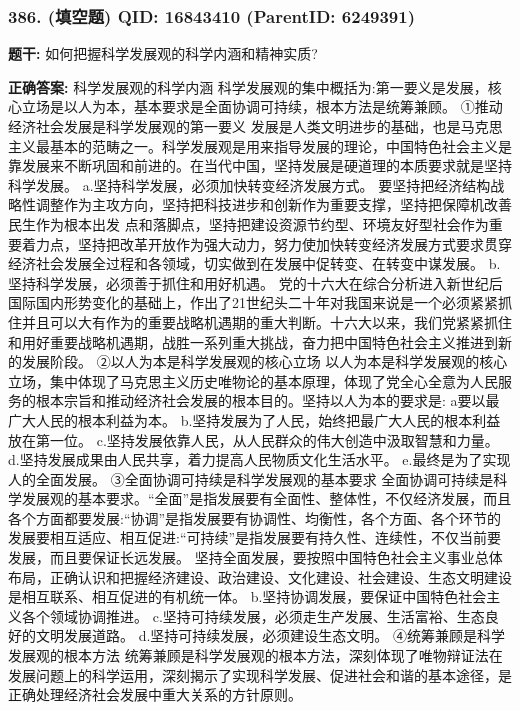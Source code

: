 \documentclass[12pt,UTF8]{ctexart}
\begin{document}
\subsubsection*{386. (填空题) \small QID: 16843410 (ParentID: 6249391)}

\textbf{题干:}
如何把握科学发展观的科学内涵和精神实质?



\textbf{正确答案:}
科学发展观的科学内涵
科学发展观的集中概括为:第一要义是发展，核心立场是以人为本，基本要求是全面协调可持续，根本方法是统筹兼顾。
①推动经济社会发展是科学发展观的第一要义
发展是人类文明进步的基础，也是马克思主义最基本的范畴之一。科学发展观是用来指导发展的理论，中国特色社会主义是靠发展来不断巩固和前进的。在当代中国，坚持发展是硬道理的本质要求就是坚持科学发展。
a.坚持科学发展，必须加快转变经济发展方式。
要坚持把经济结构战略性调整作为主攻方向，坚持把科技进步和创新作为重要支撑，坚持把保障机改善民生作为根本出发
点和落脚点，坚持把建设资源节约型、环境友好型社会作为重要着力点，坚持把改革开放作为强大动力，努力使加快转变经济发展方式要求贯穿经济社会发展全过程和各领域，切实做到在发展中促转变、在转变中谋发展。
b.坚持科学发展，必须善于抓住和用好机遇。
党的十六大在综合分析进入新世纪后国际国内形势变化的基础上，作出了21世纪头二十年对我国来说是一个必须紧紧抓住并且可以大有作为的重要战略机遇期的重大判断。十六大以来，我们党紧紧抓住和用好重要战略机遇期，战胜一系列重大挑战，奋力把中国特色社会主义推进到新的发展阶段。
②以人为本是科学发展观的核心立场
以人为本是科学发展观的核心立场，集中体现了马克思主义历史唯物论的基本原理，体现了党全心全意为人民服务的根本宗旨和推动经济社会发展的根本目的。坚持以人为本的要求是:
a要以最广大人民的根本利益为本。
b.坚持发展为了人民，始终把最广大人民的根本利益放在第一位。
c.坚持发展依靠人民，从人民群众的伟大创造中汲取智慧和力量。
d.坚持发展成果由人民共享，着力提高人民物质文化生活水平。
e.最终是为了实现人的全面发展。
③全面协调可持续是科学发展观的基本要求
全面协调可持续是科学发展观的基本要求。“全面”是指发展要有全面性、整体性，不仅经济发展，而且各个方面都要发展:“协调”是指发展要有协调性、均衡性，各个方面、各个环节的发展要相互适应、相互促进:“可持续”是指发展要有持久性、连续性，不仅当前要发展，而且要保证长远发展。
坚持全面发展，要按照中国特色社会主义事业总体布局，正确认识和把握经济建设、政治建设、文化建设、社会建设、生态文明建设是相互联系、相互促进的有机统一体。
b.坚持协调发展，要保证中国特色社会主义各个领域协调推进。
c.坚持可持续发展，必须走生产发展、生活富裕、生态良好的文明发展道路。
d.坚持可持续发展，必须建设生态文明。
④统筹兼顾是科学发展观的根本方法
统筹兼顾是科学发展观的根本方法，深刻体现了唯物辩证法在发展问题上的科学运用，深刻揭示了实现科学发展、促进社会和谐的基本途径，是正确处理经济社会发展中重大关系的方针原则。
\end{document}
